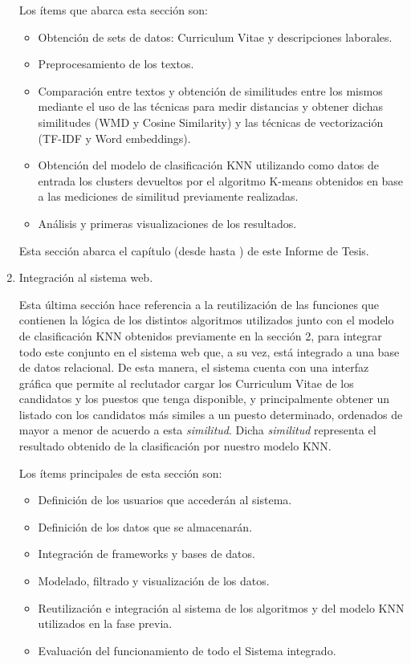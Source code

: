 \documentclass[12pt,a4paper]{article}
\begin{document}
\begin{sloppypar}
\begin{enumerate}
\cleardoublepage    %

Los ítems que abarca esta sección son:

\begin{itemize}
	\item Obtención de sets de datos: Curriculum Vitae y descripciones laborales. 
	\item Preprocesamiento de los textos.
	\item Comparación entre textos y obtención de similitudes entre los mismos mediante el uso de las técnicas para medir distancias y obtener dichas similitudes (WMD y Cosine Similarity) y las técnicas de vectorización (TF-IDF y Word embeddings).
	\item Obtención del modelo de clasificación KNN utilizando como datos de entrada los clusters devueltos por el algoritmo K-means obtenidos en base a las mediciones de similitud previamente realizadas.
	\item Análisis y primeras visualizaciones de los resultados.
\end{itemize} 
 
Esta sección abarca el capítulo \textit{} (desde \textit{} hasta \textit{}) de este Informe de Tesis. \\

\item Integración al sistema web.

Esta última sección hace referencia a la reutilización de las funciones que contienen la lógica de los distintos algoritmos utilizados junto con el modelo de clasificación KNN obtenidos previamente en la sección 2, para integrar todo este conjunto en el sistema web que, a su vez, está integrado a una base de datos relacional. De esta manera, el sistema cuenta con una interfaz gráfica que permite al reclutador cargar los Curriculum Vitae de los candidatos y los puestos que tenga disponible, y principalmente obtener un listado con los candidatos más similes a un puesto determinado, ordenados de mayor a menor de acuerdo a esta \textit{similitud}. Dicha \textit{similitud} representa el resultado obtenido de la clasificación por nuestro modelo KNN.

Los ítems principales de esta sección son:
\begin{itemize}
	\item Definición de los usuarios que accederán al sistema.
	\item Definición de los datos que se almacenarán.
	\item Integración de frameworks y bases de datos.  
	\item Modelado, filtrado y visualización de los datos.
	\item Reutilización e integración al sistema de los algoritmos y del modelo KNN utilizados en la fase previa.	
	\item Evaluación del funcionamiento de todo el Sistema integrado.
\end{itemize} 


\end{enumerate}
\end{sloppypar}
\end{document}
